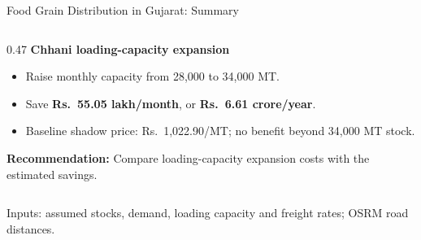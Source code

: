 \documentclass[aspectratio=169,10pt]{beamer}
\begin{document}
\begin{frame}[t]{Food Grain Distribution in Gujarat: Summary}
\begin{columns}[T,onlytextwidth]
\begin{column}{0.47\textwidth}
\textbf{Chhani loading-capacity expansion}
\begin{itemize}\setlength{\itemsep}{2pt}
\item Raise monthly capacity from 28,000 to 34,000 MT.
\item Save \textbf{Rs.\ 55.05 lakh/month}, or \textbf{Rs.\ 6.61 crore/year}.
\item Baseline shadow price: Rs.\ 1,022.90/MT; no benefit beyond 34,000 MT stock.
\end{itemize}
\textbf{Recommendation:} Compare loading-capacity expansion costs with the estimated savings.
\end{column}
\end{columns}
\vspace{0.05cm}
{\scriptsize Inputs: assumed stocks, demand, loading capacity and freight rates; OSRM road distances.}
\end{frame}
\end{document}
